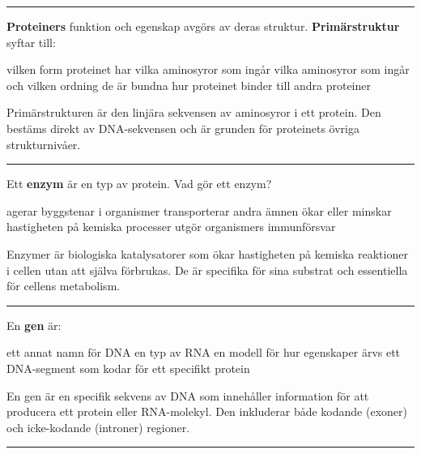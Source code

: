 \documentclass{exam}
\begin{document}
\begin{questions}
\vspace{5mm}
\hrule
\vspace{5mm}

\question \textbf{Proteiners} funktion och egenskap avgörs av deras struktur. \textbf{Primärstruktur} syftar till:  
\begin{checkboxes}
   \choice vilken form proteinet har
   \choice vilka aminosyror som ingår
   \correctchoice vilka aminosyror som ingår och vilken ordning de är bundna
   \choice hur proteinet binder till andra proteiner
\end{checkboxes}
\begin{solution}
Primärstrukturen är den linjära sekvensen av aminosyror i ett protein. Den bestäms direkt av DNA-sekvensen och är grunden för proteinets övriga strukturnivåer.
\end{solution}

\vspace{5mm}
\hrule
\vspace{5mm}

\question Ett \textbf{enzym} är en typ av protein. Vad gör ett enzym?  
\begin{checkboxes}
   \choice agerar byggstenar i organismer
   \choice transporterar andra ämnen
   \correctchoice ökar eller minskar hastigheten på kemiska processer
   \choice utgör organismers immunförsvar
\end{checkboxes}
\begin{solution}
Enzymer är biologiska katalysatorer som ökar hastigheten på kemiska reaktioner i cellen utan att själva förbrukas. De är specifika för sina substrat och essentiella för cellens metabolism.
\end{solution}

\vspace{5mm}
\hrule
\vspace{5mm}

\question En \textbf{gen} är:  
\begin{checkboxes}
   \choice ett annat namn för DNA
   \choice en typ av RNA
   \choice en modell för hur egenskaper ärvs
   \correctchoice ett DNA-segment som kodar för ett specifikt protein
\end{checkboxes}
\begin{solution}
En gen är en specifik sekvens av DNA som innehåller information för att producera ett protein eller RNA-molekyl. Den inkluderar både kodande (exoner) och icke-kodande (introner) regioner.
\end{solution}

\vspace{5mm}
\hrule
\vspace{5mm}


\end{questions}
\end{document}
